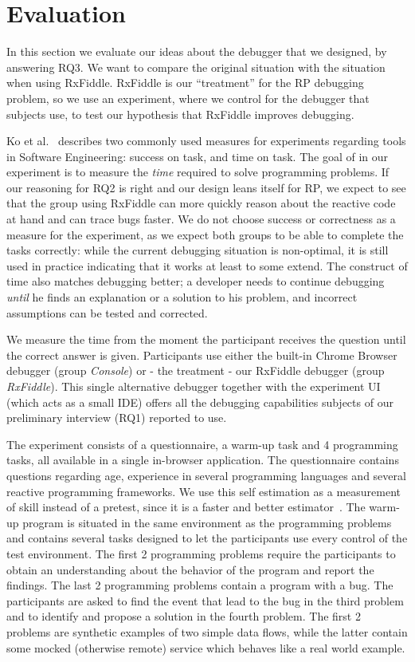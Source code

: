 \section{Evaluation}
\label{section-evaluation}

In this section we evaluate our ideas about the debugger that we designed, by answering RQ3. 
We want to compare the original situation with the situation when using RxFiddle. 
RxFiddle is our ``treatment'' for the RP debugging problem, so we use an experiment, where we control for the debugger that subjects use, to test our hypothesis that RxFiddle improves debugging.

Ko et al.~\cite{ko2015practical} describes two commonly used measures for experiments regarding tools in Software Engineering: success on task, and time on task.
The goal of in our experiment is to measure the \textit{time} required to solve programming problems.
If our reasoning for RQ2 is right and our design leans itself for RP, we expect to see that the group using RxFiddle can more quickly reason about the reactive code at hand and can trace bugs faster.
We do not choose success or correctness as a measure for the experiment, as we expect both groups to be able to complete the tasks correctly: while the current debugging situation is non-optimal, it is still used in practice indicating that it works at least to some extend.
The construct of time also matches debugging better; a developer needs to continue debugging \textit{until} he finds an explanation or a solution to his problem, and incorrect assumptions can be tested and corrected. 

We measure the time from the moment the participant receives the question until the correct answer is given. Participants use either the built-in Chrome Browser debugger (group \emph{Console}) or - the treatment - our RxFiddle debugger (group \emph{RxFiddle}). This single alternative debugger together with the experiment UI (which acts as a small IDE) offers all the debugging capabilities subjects of our preliminary interview (RQ1) reported to use.

The experiment consists of a questionnaire, a warm-up task and 4 programming tasks, all available in a single in-browser application. The questionnaire contains questions regarding age, experience in several programming languages and several reactive programming frameworks. We use this self estimation as a measurement of skill instead of a pretest, since it is a faster and better estimator~\cite{kleinschmager2011rate,feigenspan2012measuring,siegmund2014measuring}. The warm-up program is situated in the same environment as the programming problems and contains several tasks designed to let the participants use every control of the test environment. The first 2 programming problems require the participants to obtain an understanding about the behavior of the program and report the findings. The last 2 programming problems contain a program with a bug. The participants are asked to find the event that lead to the bug in the third problem and to identify and propose a solution in the fourth problem. The first 2 problems are synthetic examples of two simple data flows, while the latter contain some mocked (otherwise remote) service which behaves like a real world example.

